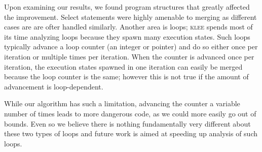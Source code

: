 \documentclass[12pt,a4paper]{article}
\newcommand{\klee}{\textsc{klee }}
\begin{document}
Upon examining our results, we found program structures that greatly affected the improvement. Select statements were highly amenable to merging as different cases are are ofter handled similarly. Another area is loops; \klee spends most of its time analyzing loops because they spawn many execution states. Such loops typically advance a loop counter (an integer or pointer) and do so either once per iteration or multiple times per iteration. When the counter is advanced once per iteration, the execution states spawned in one iteration can easily be merged because the loop counter is the same; however this is not true if the amount of advancement is loop-dependent.

While our algorithm has such a limitation, advancing the counter a variable number of times leads to more dangerous code, as we could more easily go out of bounds. Even so we believe there is nothing fundamentally very different about these two types of loops and future work is aimed at speeding up analysis of such loops.
\end{document}
